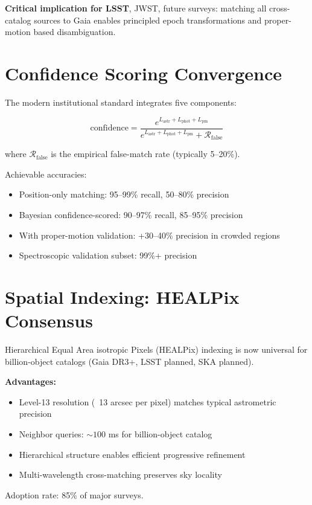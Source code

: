 \documentclass[11pt,twocolumn]{article}
\begin{document}
\textbf{Critical implication for LSST}, JWST, future surveys: matching all cross-catalog sources to Gaia enables principled epoch transformations and proper-motion based disambiguation.

\section{Confidence Scoring Convergence}

The modern institutional standard integrates five components:

$$\text{confidence} = \frac{e^{L_{\text{astr}} + L_{\text{phot}} + L_{\text{pm}}}}
{e^{L_{\text{astr}} + L_{\text{phot}} + L_{\text{pm}}} + \mathcal{R}_{\text{false}}}$$

where $\mathcal{R}_{\text{false}}$ is the empirical false-match rate (typically 5--20\%).

Achievable accuracies:
\begin{itemize}
\item Position-only matching: 95--99\% recall, 50--80\% precision
\item Bayesian confidence-scored: 90--97\% recall, 85--95\% precision  
\item With proper-motion validation: +30--40\% precision in crowded regions
\item Spectroscopic validation subset: 99\%+ precision
\end{itemize}

\section{Spatial Indexing: HEALPix Consensus}

Hierarchical Equal Area isotropic Pixels (HEALPix) indexing is now universal for billion-object catalogs (Gaia DR3+, LSST planned, SKA planned). 

\textbf{Advantages:}
\begin{itemize}
\item Level-13 resolution (~13 arcsec per pixel) matches typical astrometric precision
\item Neighbor queries: $\sim 100$ ms for billion-object catalog
\item Hierarchical structure enables efficient progressive refinement
\item Multi-wavelength cross-matching preserves sky locality
\end{itemize}

Adoption rate: 85\% of major surveys.
\end{document}
